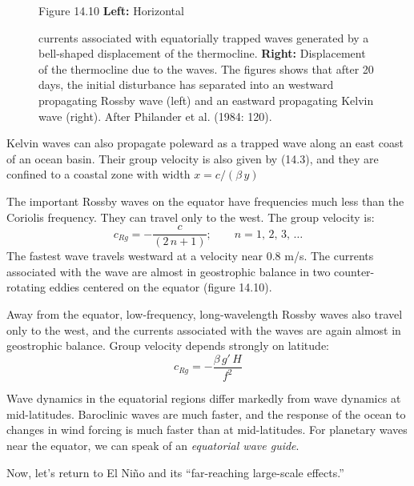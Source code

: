 \begin{figure}[t!]
\footnotesize
Figure 14.10 \textbf{Left:} Horizontal \rule{0pt}{4ex}currents associated with equatorially trapped waves generated by a bell-shaped displacement of the thermocline.
\textbf{Right:} Displacement of the thermocline due to the waves. The figures shows that after 20 days, the initial disturbance has separated into an westward propagating Rossby wave (left) and an eastward propagating Kelvin wave (right). After Philander et al. (1984: 120).
\label{fig:rossbycurrents}
\vspace{-4ex}
\end{figure}

Kelvin waves can also propagate poleward as a trapped wave along an east coast of an ocean basin. Their group velocity is also given by (14.3), and they are confined to a coastal zone with width $x=c/\left(\beta\,y\right)$

The important Rossby waves on the equator have frequencies much less than the Coriolis frequency. They can travel only to the west. The group velocity is:
\begin{equation}
c_{Rg} = - \frac{c}{\left(2\,n+1\right)}; \qquad n=1,\,2,\,3,\,\ldots
\end{equation}
The fastest wave travels westward at a velocity near 0.8 m/s. The currents associated with the wave are almost in geostrophic balance in two counter-rotating eddies centered on the equator (figure
14.10).

Away from the equator, low-frequency, long-wavelength Rossby waves also
travel only to the west, and the currents associated with the waves are again almost in geostrophic balance. Group velocity depends strongly on latitude:
\begin{equation}
c_{Rg} = -\frac{\beta\,g'\,H}{f^2}
\end{equation}

Wave dynamics in the equatorial regions differ markedly from wave dynamics at mid-latitudes. Baroclinic waves are much faster, and the response of the ocean to changes in wind forcing is much faster than at mid-latitudes. For planetary waves near the equator, we can speak of an \textit{equatorial wave guide}.

Now, let's return to El Ni\~{n}o and its ``far-reaching large-scale effects.''

